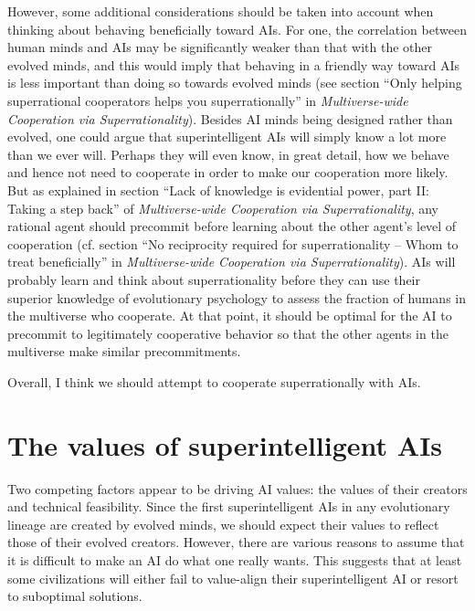 \documentclass[]{article}
\begin{document}
However, some additional considerations should be taken into account
when thinking about behaving beneficially toward AIs. For one, the
correlation between human minds and AIs may be significantly weaker than
that with the other evolved minds, and this would imply that behaving in
a friendly way toward AIs is less important than doing so towards
evolved minds (see section ``Only helping superrational cooperators
helps you superrationally'' in \emph{Multiverse-wide Cooperation via
Superrationality}).
Besides AI minds being designed rather than evolved, one could argue that superintelligent AIs will
simply know a lot more than we ever will. Perhaps they will even know,
in great detail, how we behave and hence not need to cooperate in order
to make our cooperation more likely. But as explained in section
``Lack
of knowledge is evidential power, part II: Taking a step back'' of
\emph{Multiverse-wide Cooperation via Superrationality}, 
any rational
agent should precommit before learning about the other agent's level of
cooperation (cf. section
``No
reciprocity required for superrationality -- Whom to treat
beneficially'' in \emph{Multiverse-wide Cooperation
via Superrationality}).
AIs will probably learn and think about superrationality before they can use their superior knowledge of
evolutionary psychology to assess the fraction of humans in the
multiverse who cooperate. At that point, it should be optimal for the AI
to precommit to legitimately cooperative behavior so that the other
agents in the multiverse make similar precommitments.

Overall, I think we should attempt to cooperate superrationally with
AIs.

\section{The values of superintelligent AIs}
\label{the-values-of-superintelligent-ais}

Two competing factors appear to be driving AI values: the values of
their creators and technical feasibility. Since the first
superintelligent AIs in any evolutionary lineage are created by evolved
minds, we should expect their values to reflect those of their evolved
creators. However, there are various reasons to assume that it is
difficult to make an AI do what one really wants. This suggests that at
least some civilizations will either fail to value-align their
superintelligent AI or resort to suboptimal solutions.
\end{document}
